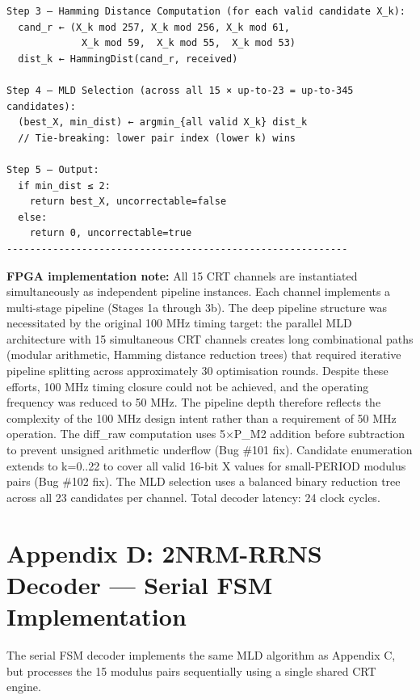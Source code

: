 \documentclass[
  12pt,
  a4paper]{report}
\begin{document}
\begin{verbatim}
Step 3 — Hamming Distance Computation (for each valid candidate X_k):
  cand_r ← (X_k mod 257, X_k mod 256, X_k mod 61,
             X_k mod 59,  X_k mod 55,  X_k mod 53)
  dist_k ← HammingDist(cand_r, received)

Step 4 — MLD Selection (across all 15 × up-to-23 = up-to-345 candidates):
  (best_X, min_dist) ← argmin_{all valid X_k} dist_k
  // Tie-breaking: lower pair index (lower k) wins

Step 5 — Output:
  if min_dist ≤ 2:
    return best_X, uncorrectable=false
  else:
    return 0, uncorrectable=true
-----------------------------------------------------------
\end{verbatim}

\textbf{FPGA implementation note:} All 15 CRT channels are instantiated
simultaneously as independent pipeline instances. Each channel
implements a multi-stage pipeline (Stages 1a through 3b). The deep
pipeline structure was necessitated by the original 100 MHz timing
target: the parallel MLD architecture with 15 simultaneous CRT channels
creates long combinational paths (modular arithmetic, Hamming distance
reduction trees) that required iterative pipeline splitting across
approximately 30 optimisation rounds. Despite these efforts, 100 MHz
timing closure could not be achieved, and the operating frequency was
reduced to 50 MHz. The pipeline depth therefore reflects the complexity
of the 100 MHz design intent rather than a requirement of 50 MHz
operation. The diff\_raw computation uses 5×P\_M2 addition before
subtraction to prevent unsigned arithmetic underflow (Bug \#101 fix).
Candidate enumeration extends to k=0..22 to cover all valid 16-bit X
values for small-PERIOD modulus pairs (Bug \#102 fix). The MLD selection
uses a balanced binary reduction tree across all 23 candidates per
channel. Total decoder latency: 24 clock cycles.

\section{Appendix D: 2NRM-RRNS Decoder --- Serial FSM
Implementation}\label{appendix-d-2nrm-rrns-decoder-serial-fsm-implementation}

The serial FSM decoder implements the same MLD algorithm as Appendix C,
but processes the 15 modulus pairs sequentially using a single shared
CRT engine.
\end{document}
